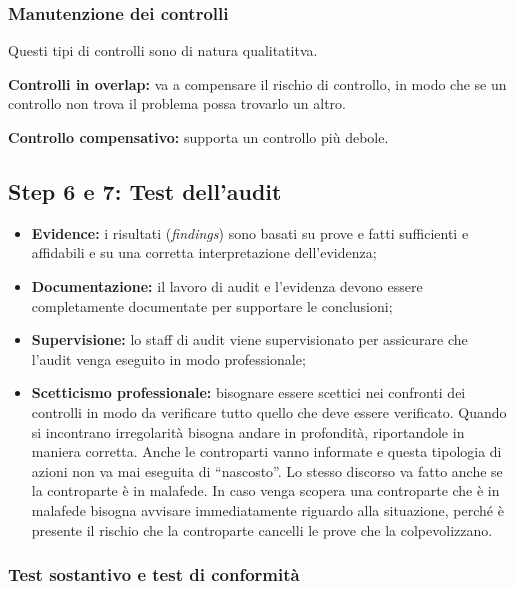 \subsubsection{Manutenzione dei controlli}

Questi tipi di controlli sono di natura qualitatitva.

\textbf{Controlli in overlap:} va a compensare il rischio di controllo, in modo che se 
un controllo non trova il problema possa trovarlo un altro.

\textbf{Controllo compensativo:} supporta un controllo più debole.

\subsection{Step 6 e 7: Test dell'audit}

\begin{itemize}
\item \textbf{Evidence:} i risultati (\emph{findings}) sono basati su prove e fatti 
sufficienti e affidabili e su una corretta interpretazione dell'evidenza; 

\item \textbf{Documentazione:} il lavoro di audit e l'evidenza 
devono essere completamente documentate per supportare le conclusioni;

\item \textbf{Supervisione:} lo staff di audit viene supervisionato per assicurare che l'audit 
venga eseguito in modo professionale;

\item \textbf{Scetticismo professionale:} bisognare essere scettici nei confronti dei 
controlli in modo da verificare tutto quello che deve essere verificato.
Quando si incontrano irregolarità bisogna andare in profondità, riportandole 
in maniera corretta. Anche le controparti vanno informate e questa tipologia di 
azioni non va mai eseguita di ``nascosto''. Lo stesso discorso va fatto anche 
se la controparte è in malafede. In caso venga scopera una controparte che è in 
malafede bisogna avvisare immediatamente riguardo alla situazione, perché è 
presente il rischio che la controparte cancelli le prove che la colpevolizzano.
\end{itemize}

\subsubsection{Test sostantivo e test di conformità}

